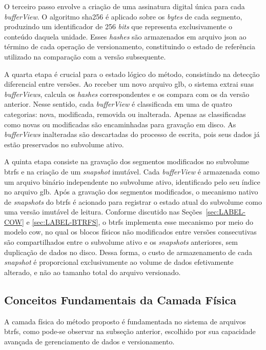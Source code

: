 O terceiro passo envolve a criação de uma assinatura digital única para cada
\textit{bufferView}. O algoritmo \gls{sha256} é aplicado sobre os \textit{bytes} de
cada segmento, produzindo um identificador de 256 \textit{bits} que representa
exclusivamente o conteúdo daquela unidade. Esses \textit{hashes} são armazenados em
arquivo \gls{json} ao término de cada operação de versionamento, constituindo o
estado de referência utilizado na comparação com a versão subsequente.

A quarta etapa é crucial para o estado lógico do método, consistindo na detecção
diferencial entre versões. Ao receber um novo arquivo \gls{glb}, o sistema extrai
suas \textit{bufferViews}, calcula os \textit{hashes} correspondentes e os compara
com os da versão anterior. Nesse sentido, cada \textit{bufferView} é classificada em
uma de quatro categorias: nova, modificada, removida ou inalterada. Apenas as
classificadas como novas ou modificadas são encaminhadas para gravação em disco. As
\textit{bufferViews} inalteradas são descartadas do processo de escrita, pois seus
dados já estão preservados no subvolume ativo.

A quinta etapa consiste na gravação dos segmentos modificados no subvolume
\gls{btrfs} e na criação de um \textit{snapshot} imutável. Cada \textit{bufferView}
é armazenada como um arquivo binário independente no subvolume ativo, identificado
pelo seu índice no arquivo \gls{glb}. Após a gravação dos segmentos modificados, o
mecanismo nativo de \textit{snapshots} do \gls{btrfs} é acionado para registrar o
estado atual do subvolume como uma versão imutável de leitura. Conforme discutido
nas Seções~\ref{sec:LABEL-COW} e \ref{sec:LABEL-BTRFS}, o \gls{btrfs} implementa
esse mecanismo por meio do modelo \gls{cow}, no qual os blocos físicos não
modificados entre versões consecutivas são compartilhados entre o subvolume ativo e
os \textit{snapshots} anteriores, sem duplicação de dados no disco. Dessa forma, o
custo de armazenamento de cada \textit{snapshot} é proporcional exclusivamente ao
volume de dados efetivamente alterado, e não ao tamanho total do arquivo versionado.

\subsection{Conceitos Fundamentais da Camada Física}

A camada física do método proposto é fundamentada no sistema de arquivos
\gls{btrfs}, como pode-se observar na subseção anterior, escolhido por sua
capacidade avançada de gerenciamento de dados e versionamento.

